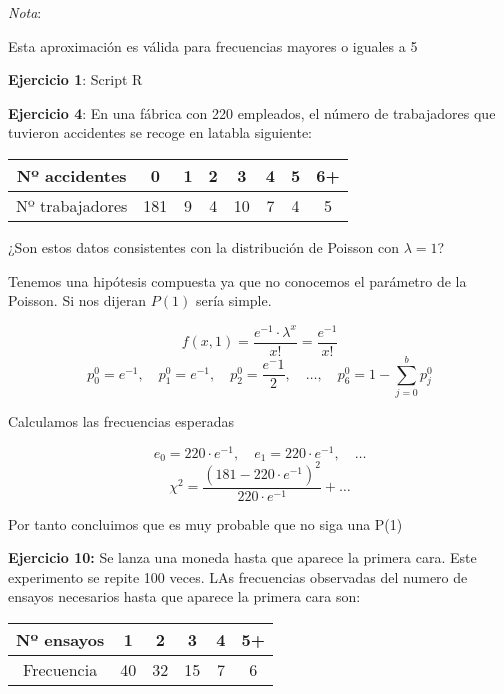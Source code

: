 \noindent \textit{Nota}:

Esta aproximación es válida para frecuencias mayores o iguales a 5

\vspace{5mm}

\textbf{Ejercicio 1}: Script R

\vspace{5mm}

\textbf{Ejercicio 4}: En una fábrica con 220 empleados, el número de trabajadores que tuvieron accidentes se recoge en latabla siguiente:

\begin{table}[!h]
    \centering
    \begin{tabular}{|c|c|c|c|c|c|c|c|}
        \hline
        {Nº accidentes} & 0 & 1 & 2 & 3 & 4 & 5 & 6+ \\ \hline
        {Nº trabajadores} & 181 & 9 & 4 & 10 & 7 & 4 & 5 \\ \hline
    \end{tabular}
\end{table}

¿Son estos datos consistentes con la distribución de Poisson con $\lambda=1$?

Tenemos una hipótesis compuesta ya que no conocemos el parámetro de la Poisson.
Si nos dijeran $P(1)$ sería simple.

\[
    f(x,1)=\frac{e^{-1}\cdot \lambda^x}{x!}=\frac{e^{-1}}{x!}
\]
\[
    p_0^0=e^{-1} ,\quad p_1^0=e^{-1} ,\quad p_2^0=\frac{e^-1}{2} ,\quad \dots,\quad p_6^0=1-\sum_{j=0}^{b}p_j^0
\]

Calculamos las frecuencias esperadas

\[
    e_0=220 \cdot e^{-1},\quad e_1=220 \cdot e^{-1}, \quad \dots
\]
\[
    \chi^2=\frac{(181-220 \cdot e^{-1})^2}{220 \cdot e^{-1}}+\dots
\]

Por tanto concluimos que es muy probable que no siga una P(1)

\textbf{Ejercicio 10:} Se lanza una moneda hasta que aparece la primera cara. Este experimento se repite 100 veces. LAs frecuencias observadas del numero de ensayos necesarios hasta que aparece la primera cara son:

\begin{table}[!h]
    \centering
    \begin{tabular}{|c|c|c|c|c|c|}
        \hline
        {Nº ensayos} & 1 & 2 & 3 & 4 & 5+ \\ \hline
        {Frecuencia} & 40 & 32 & 15 & 7 & 6 \\ \hline
    \end{tabular}
\end{table}

